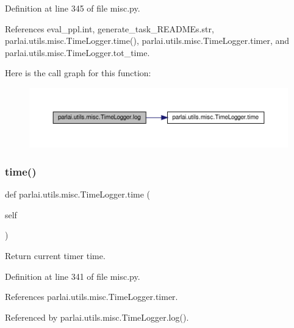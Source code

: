 Definition at line 345 of file misc.\+py.



References eval\+\_\+ppl.\+int, generate\+\_\+task\+\_\+\+R\+E\+A\+D\+M\+Es.\+str, parlai.\+utils.\+misc.\+Time\+Logger.\+time(), parlai.\+utils.\+misc.\+Time\+Logger.\+timer, and parlai.\+utils.\+misc.\+Time\+Logger.\+tot\+\_\+time.

Here is the call graph for this function\+:
\nopagebreak
\begin{figure}[H]
\begin{center}
\leavevmode
\includegraphics[width=350pt]{classparlai_1_1utils_1_1misc_1_1TimeLogger_a52458d882781ad6a6cbcea479ff495de_cgraph}
\end{center}
\end{figure}
\mbox{\label{classparlai_1_1utils_1_1misc_1_1TimeLogger_aa8e859dc10c12159501bbf545ca62a51}} 
\subsubsection{\texorpdfstring{time()}{time()}}
{\footnotesize\ttfamily def parlai.\+utils.\+misc.\+Time\+Logger.\+time (\begin{DoxyParamCaption}\item[{}]{self }\end{DoxyParamCaption})}

\begin{DoxyVerb}Return current timer time.\end{DoxyVerb}
 

Definition at line 341 of file misc.\+py.



References parlai.\+utils.\+misc.\+Time\+Logger.\+timer.



Referenced by parlai.\+utils.\+misc.\+Time\+Logger.\+log().

